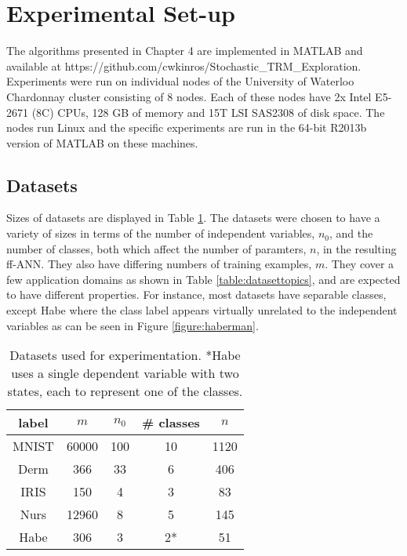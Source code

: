 \documentclass[letterpaper,12pt,titlepage,oneside,final]{book}
\begin{document}
	
	\section{Experimental Set-up}
	
	The algorithms presented in Chapter 4 are implemented in MATLAB and available at  https://github.com/cwkinros/Stochastic\_TRM\_Exploration. Experiments were run on individual nodes of the University of Waterloo Chardonnay cluster consisting of 8 nodes. Each of these nodes have 2x Intel E5-2671 (8C) CPUs, 128 GB of memory and 15T LSI SAS2308 of disk space. The nodes run Linux and the specific experiments are run in the 64-bit R2013b version of MATLAB on these machines.
	
	\subsection{Datasets}
	
	Sizes of datasets are displayed in Table \ref{table:datasets}. The datasets were chosen to have a variety of sizes in terms of the number of independent variables, $n_{0}$, and the number of classes, both which affect the number of paramters, $n$, in the resulting ff-ANN. They also have differing numbers of training examples, $m$. They cover a few application domains as shown in Table \ref{table:datasettopics}, and are expected to have different properties. For instance, most datasets have separable classes, except Habe where the class label appears virtually unrelated to the independent variables as can be seen in Figure \ref{figure:haberman}.
	
	\begin{table}[h]
		\begin{center}
			\begin{tabular}{ |c|c|c|c|c| }  
				\hline
				\textbf{label} & \textbf{$m$} & \textbf{$n_{0}$} & \textbf{\# classes} & $n$  \\
				\hline
				MNIST & 60000 & 100 & 10 & 1120 \\
				Derm & 366 & 33 & 6 & 406 \\
				IRIS & 150 & 4 & 3 & 83\\
				Nurs & 12960 & 8 & 5 & 145 \\
				Habe & 306 & 3 & 2* & 51 \\ 
				\hline
			\end{tabular}
			\caption{Datasets used for experimentation. *Habe uses a single dependent variable with two states, each to represent one of the classes.}
			\label{table:datasets}
		\end{center}
	\end{table}
	
\end{document}
